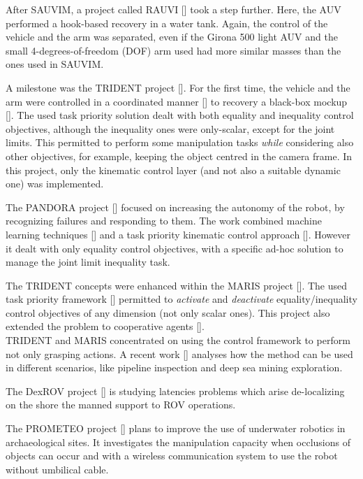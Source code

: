 After SAUVIM, a project called RAUVI [\cite{IntroRauvi}] took a step further. Here, the AUV performed a hook-based recovery in a water tank. Again, the control of the vehicle and the arm was separated, even if the Girona 500 light AUV and the small 4-degrees-of-freedom (DOF) arm used had more similar masses than the ones used in SAUVIM.

A milestone was the TRIDENT project [\cite{IntroTrident1}]. For the first time, the vehicle and the arm were controlled in a coordinated manner [\cite{IntroTrident2}] to recovery a black-box mockup [\cite{IntroTrident4}]. The used task priority solution dealt with both equality and inequality control objectives, although the inequality ones were only-scalar, except for the joint limits. This permitted to perform some manipulation tasks \textit{while} considering also other objectives, for example, keeping the object centred in the camera frame. In this project, only the kinematic control layer (and not also a suitable dynamic one) was implemented.

The PANDORA project [\cite{IntroPandora1}] focused on increasing the autonomy of the robot, by recognizing failures and responding to them. The work combined machine learning techniques [\cite{IntroPandora2}] and a task priority kinematic control approach [\cite{IntroPandora3}]. However it dealt with only equality control objectives, with a specific ad-hoc solution to manage the joint limit inequality task.

The TRIDENT concepts were enhanced within the MARIS project [\cite{IntroMaris0}]. The used task priority framework [\cite{IntroMaris1}] permitted to \textit{activate} and \textit{deactivate} equality/inequality control objectives of any dimension (not only scalar ones). This project also extended the problem to cooperative agents [\cite{IntroMaris2}].\\


TRIDENT and MARIS concentrated on using the control framework to perform not only grasping actions. A recent work  [\cite{IntroRecent}] analyses how the method can be used in different scenarios, like pipeline inspection and deep sea mining exploration.

The DexROV project [\cite{IntroDexrov}] is studying latencies problems which arise de-localizing on the shore the manned support to ROV operations.

The PROMETEO project [\cite{IntroPrometeo}] plans to improve the use of underwater robotics in archaeological sites. It investigates the manipulation capacity when occlusions of objects can occur and with a wireless communication system to use the robot without umbilical cable.

